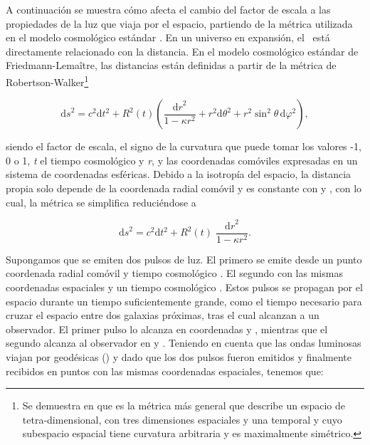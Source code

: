 A continuación se muestra cómo afecta el cambio del factor de escala a las propiedades de la luz que viaja por el espacio, partiendo de la métrica utilizada en el modelo cosmológico estándar \citep{book:cosmologia}. En un universo en expansión, el \rt\ está directamente relacionado con la distancia.
En el modelo cosmológico estándar de Friedmann-Lema\^{i}tre, las distancias están definidas a partir de la métrica de Robertson-Walker\footnote{Se  demuestra en \cite{book:weinberg_1974} que es la métrica más general que describe un espacio de tetra-dimensional, con tres dimensiones espaciales y una temporal y cuyo subespacio espacial tiene curvatura arbitraria y es maximalmente simétrico.}

\begin{equation}\label{eq:metrica_RW}
    {\mathrm ds}^{2}= {c}^{2}\mathrm dt^2 +{R}^{2}(t) \left( \frac{{\mathrm dr}^{2}}{1-\kappa {r}^{2}} + {r}^{2}\mathrm d{\theta}^{2} +{r}^{2}{\sin}^{2}{\theta}\,\mathrm d{\varphi}^{2} \right),
\end{equation}

siendo  el factor de escala, \maths{\kappa} el signo de la curvatura que puede tomar los valores -1, 0 o 1, \textit{t} el tiempo cosmológico y \textit{r}, \maths{\theta} y \maths{\varphi} las coordenadas comóviles expresadas en un sistema de coordenadas esféricas. Debido a la isotropía del espacio, la distancia propia solo depende de la coordenada radial comóvil  y es constante con \maths{\theta} y \maths{\varphi}, con lo cual, la métrica se simplifica reduciéndose a

\begin{equation*}
    {\mathrm ds}^{2}= {c}^{2}\mathrm dt^2 +{R}^{2}(t)\;\frac{{\mathrm dr}^{2}}{1-\kappa {r}^{2}}.
\end{equation*}

Supongamos que se emiten dos pulsos de luz. El primero se emite desde un punto coordenada radial comóvil  y tiempo cosmológico . El segundo con las mismas coordenadas espaciales y un tiempo cosmológico . Estos pulsos se propagan por el espacio durante un tiempo suficientemente grande, como el tiempo necesario para cruzar el espacio entre dos galaxias próximas, tras el cual alcanzan a un observador. El primer pulso lo alcanza en coordenadas  y , mientras que el segundo alcanza al observador en  y . Teniendo en cuenta que las ondas luminosas viajan por geodésicas () y dado que los dos pulsos fueron emitidos y finalmente recibidos en puntos con las mismas coordenadas espaciales, tenemos que:

